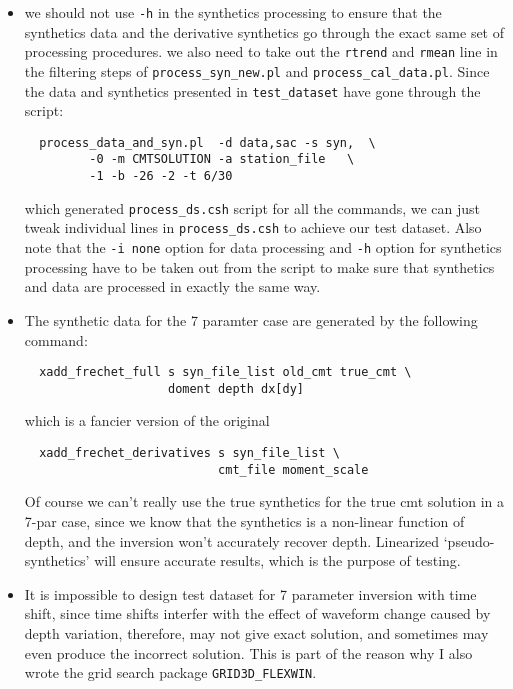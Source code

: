 \documentclass[12pt,titlepage,fleqn]{article}
\begin{document}
\begin{itemize}
\item  we should not use \verb=-h= in the synthetics processing to ensure that the synthetics data and the derivative synthetics go through the exact same set of processing procedures. we also need to take out the \verb=rtrend= and \verb=rmean= line in the filtering steps of \verb=process_syn_new.pl= and \verb=process_cal_data.pl=. Since the data and synthetics presented in \verb=test_dataset= have gone through the script:
\begin{verbatim}
  process_data_and_syn.pl  -d data,sac -s syn,  \  
         -0 -m CMTSOLUTION -a station_file   \
         -1 -b -26 -2 -t 6/30
\end{verbatim}
which generated \verb=process_ds.csh= script for all the commands, we can just tweak individual lines in \verb=process_ds.csh= to achieve our test dataset. Also
note that the \verb=-i none= option for data processing and \verb=-h= option for synthetics processing have to be taken out from the script to make sure that synthetics and data are processed in exactly the same way.

\item The synthetic data for the 7 paramter case are generated by the following command:
\begin{verbatim} 
  xadd_frechet_full s syn_file_list old_cmt true_cmt \
                    doment depth dx[dy]
\end{verbatim}
which is a fancier version of the original
\begin{verbatim}
  xadd_frechet_derivatives s syn_file_list \
                           cmt_file moment_scale
\end{verbatim}
Of course we can't really use the true synthetics for the true cmt solution in a 7-par case, since we know that the synthetics is a non-linear function of depth, and the inversion won't accurately recover depth. Linearized `pseudo-synthetics' will ensure accurate results, which is the purpose of testing.

\item It is impossible to design test dataset for 7 parameter inversion with time shift, since time shifts interfer with the effect of waveform change caused by depth variation, therefore, may not give exact solution, and sometimes may even produce the incorrect solution. This is part of the reason why I also wrote the grid search package \verb=GRID3D_FLEXWIN=.
\end{itemize}
\end{document}
